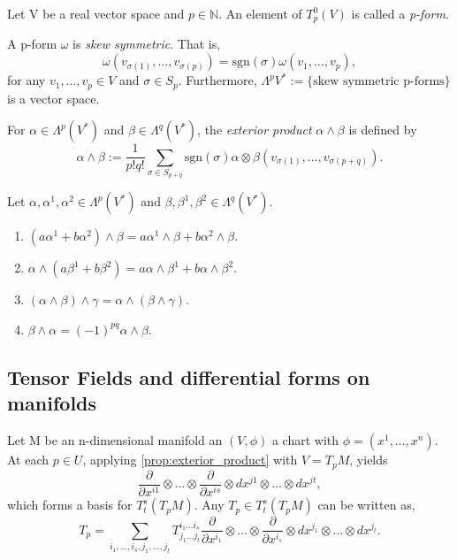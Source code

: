 \begin{definition}[p-form]
    Let V be a real vector space and $p \in \mathbb{N}$.
    An element of $T_p^0(V)$ is called a \emph{p-form}.
\end{definition}
\begin{remark}
A p-form $\omega$ is \emph{skew symmetric}. That is,
\[
\omega(v_{\sigma(1)}, \dots, v_{\sigma(p)}) = \text{sgn}(\sigma) \omega(v_1, \dots, v_p),
\]
for any $v_1, \dots, v_p \in V$ and $\sigma \in S_p$.
Furthermore, 
$\Lambda^p V^* := \{ \text{skew symmetric p-forms} \}$ is a vector space.
\end{remark}

\begin{definition}
    For $\alpha \in \Lambda^p(V^*)$ and $\beta \in \Lambda^q(V^*)$, 
    the \emph{exterior product} $\alpha \wedge \beta$ is defined by 
    \[
    \alpha \wedge \beta := \frac{1}{p! q!} \sum_{\sigma \in S_{p+q}} \text{sgn}(\sigma) \alpha \otimes \beta \left(v_{\sigma(1)}, \dots, v_{\sigma(p+q)}\right).
    \]
\end{definition}

\begin{proposition}\label{prop:exterior_product}
    Let $\alpha, \alpha^1, \alpha^2 \in \Lambda^p(V^*)$ and $\beta, \beta^1, \beta^2 \in \Lambda^q(V^*)$.
    \begin{enumerate}
        \item $\left( a \alpha^1 + b \alpha^2 \right) \wedge \beta = a \alpha^1 \wedge \beta + b \alpha^2 \wedge \beta$.
        \item $\alpha \wedge \left( a \beta^1 + b \beta^2 \right) = a \alpha \wedge \beta^1 + b \alpha \wedge \beta^2$.
        \item $\left(\alpha \wedge \beta \right) \wedge \gamma = \alpha \wedge \left( \beta \wedge \gamma \right)$.
        \item $\beta \wedge \alpha = (-1)^{pq} \alpha \wedge \beta$.
    \end{enumerate}
\end{proposition}

\subsection{Tensor Fields and differential forms on manifolds}

Let M be an n-dimensional manifold an $\left( V, \phi \right)$ a chart with
$\phi = (x^1, \dots, x^n)$. At each $p \in U$, applying \autoref{prop:exterior_product} with $V = T_pM$, yields
\[
\frac{\partial}{\partial x^{i1}} \otimes \dots \otimes \frac{\partial}{\partial x^{is}} \otimes dx^{j1} \otimes \dots \otimes dx^{jt},
\]
which forms a basis for $T_t^s(T_pM)$. Any $T_p \in T_t^s (T_pM)$ can be written as,
\[
T_p = \sum_{i_1, \dots, i_s, j_1, \dots, j_t} T_{j_1 \dots j_t}^{i_1 \dots i_s} \frac{\partial}{\partial x^{i_1}} \otimes \dots \otimes \frac{\partial}{\partial x^{i_s}} \otimes dx^{j_1} \otimes \dots \otimes dx^{j_t}.
\]


